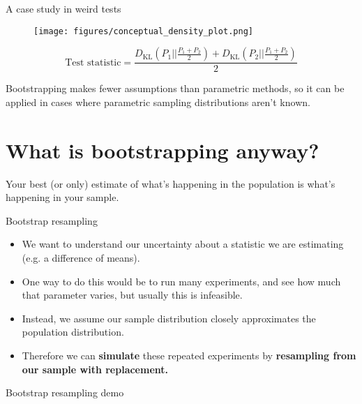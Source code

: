 \documentclass{beamer} %
\begin{document}
\begin{frame}{A case study in weird tests}
\begin{figure}
\centering
\texttt{[image: figures/conceptual\_density\_plot.png]}
\end{figure}
$$\text{Test statistic} = \frac{D_\text{KL}\left(P_1 || \frac{P_1 + P_2}{2}\right) + D_\text{KL}\left(P_2 || \frac{P_1 + P_2}{2}\right)}{2}$$
\end{frame}

\begin{frame}[standout]
Bootstrapping makes fewer assumptions than parametric methods, so it can be applied in cases where parametric sampling distributions aren't known. 
\end{frame}

\section{What is bootstrapping anyway?}

\begin{frame}[standout]
Your best (or only) estimate of what's happening in the population is what's happening in your sample. 
\end{frame}


\begin{frame}{Bootstrap resampling}
\begin{itemize}[<+->] \itemsep 1em
\item We want to understand our uncertainty about a statistic we are estimating (e.g. a difference of means).
\item One way to do this would be to run many experiments, and see how much that parameter varies, but usually this is infeasible.
\item Instead, we assume our sample distribution closely approximates the population distribution.
\item Therefore we can \textbf{simulate} these repeated experiments by \textbf{resampling from our sample with replacement.}
\end{itemize}
\end{frame}

\begin{frame}{Bootstrap resampling demo}
\begin{figure}
\centering
{}
\end{figure}
\end{frame}
\end{document}
